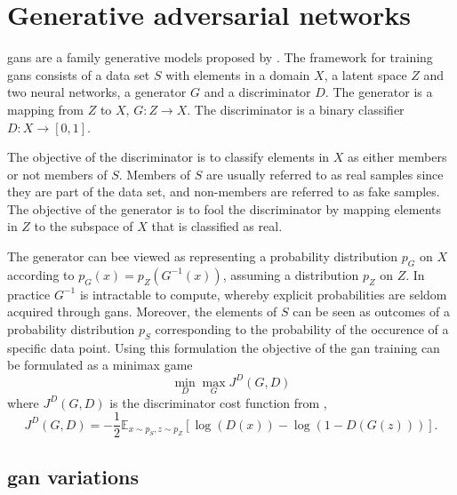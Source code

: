 \section{Generative adversarial networks}
\acrfull{gans} are a family generative models proposed by \textcite{goodfellow2014generative}. The framework for training \acrshort{gans} consists of a data set $S$ with elements in a domain $X$, a latent space $Z$ and two neural networks, a generator $G$ and a discriminator $D$. The generator is a mapping from $Z$ to $X$, $G: Z \rightarrow X$. The discriminator is a binary classifier $D: X \rightarrow [0, 1]$. 

The objective of the discriminator is to classify elements in $X$ as either members or not members of $S$. Members of $S$ are usually referred to as real samples since they are part of the data set, and non-members are referred to as fake samples. The objective of the generator is to fool the discriminator by mapping elements in $Z$ to the subspace of $X$ that is classified as real. 

The generator can bee viewed as representing a probability distribution $p_G$ on $X$ according to $p_G(x) = p_Z(G^{-1}(x))$, assuming a distribution $p_Z$ on $Z$. In practice $G^{-1}$ is intractable to compute, whereby explicit probabilities are seldom acquired through \acrshort{gans}. Moreover, the elements of $S$ can be seen as outcomes of a probability distribution $p_S$ corresponding to the probability of the occurence of a specific data point. Using this formulation the objective of the \acrshort{gan} training can be formulated as a minimax game 
\begin{equation}
    \min_D \max_G J^{D}(G, D)
\end{equation}
where $J^D(G, D)$ is the discriminator cost function from \parencite{goodfellow2016nips},
\begin{equation}
    J^D(G, D) = -\frac{1}{2}\mathbb{E}_{x \sim p_S, z \sim p_Z}\left[\log(D(x)) - \log(1 - D(G(z))) \right].
\end{equation}


\subsection{\acrshort{gan} variations}
